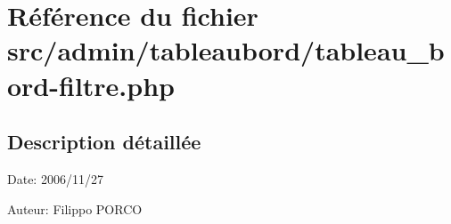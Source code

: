 \section{Référence du fichier src/admin/tableaubord/tableau\_\-bord-filtre.php}
\label{tableau__bord-filtre_8php}


\subsection{Description détaillée}
\begin{Desc}
\item[Date:]2006/11/27\end{Desc}
\begin{Desc}
\item[Auteur:]Filippo PORCO \end{Desc}


